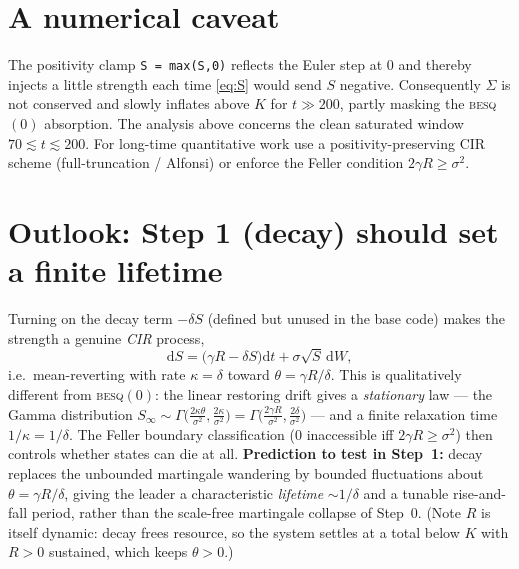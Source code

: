 \documentclass[11pt]{article}
\newcommand{\dd}{\mathrm{d}}
\begin{document}
\section{A numerical caveat}

The positivity clamp \texttt{S = max(S,0)} reflects the Euler step at $0$ and
thereby injects a little strength each time \eqref{eq:S} would send $S$ negative.
Consequently $\Sigma$ is not conserved and slowly inflates above $K$ for
$t\gg200$, partly masking the \textsc{besq}$(0)$ absorption. The analysis above
concerns the clean saturated window $70\lesssim t\lesssim200$. For long-time
quantitative work use a positivity-preserving CIR scheme (full-truncation /
Alfonsi) or enforce the Feller condition $2\gamma R\ge\sigma^2$.

\section{Outlook: Step 1 (decay) should set a finite lifetime}

Turning on the decay term $-\delta S$ (defined but unused in the base code) makes
the strength a genuine \emph{CIR} process,
\begin{equation}
\dd S=\big(\gamma R-\delta S\big)\dd t+\sigma\sqrt S\,\dd W,
\end{equation}
i.e.\ mean-reverting with rate $\kappa=\delta$ toward $\theta=\gamma R/\delta$.
This is qualitatively different from \textsc{besq}$(0)$: the linear restoring
drift gives a \emph{stationary} law --- the Gamma distribution
$S_\infty\sim\Gamma\!\big(\tfrac{2\kappa\theta}{\sigma^2},\tfrac{2\kappa}{\sigma^2}\big)
=\Gamma\!\big(\tfrac{2\gamma R}{\sigma^2},\tfrac{2\delta}{\sigma^2}\big)$ --- and a
finite relaxation time $1/\kappa=1/\delta$. The Feller boundary classification
($0$ inaccessible iff $2\gamma R\ge\sigma^2$) then controls whether states can die
at all. \textbf{Prediction to test in Step~1:} decay replaces the unbounded
martingale wandering by bounded fluctuations about $\theta=\gamma R/\delta$, giving
the leader a characteristic \emph{lifetime} $\sim1/\delta$ and a tunable
rise-and-fall period, rather than the scale-free martingale collapse of Step~0.
(Note $R$ is itself dynamic: decay frees resource, so the system settles at a
total below $K$ with $R>0$ sustained, which keeps $\theta>0$.)
\end{document}
